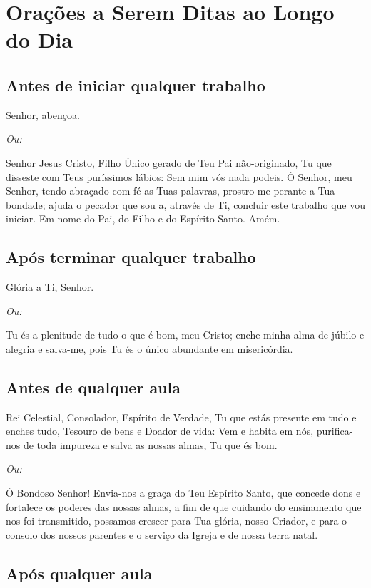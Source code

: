 \documentclass{subfiles}
\begin{document}
\chapter{Orações a Serem Ditas ao Longo do Dia}

\section*{Antes de iniciar qualquer trabalho}

Senhor, abençoa.

\textit{Ou:}

Senhor Jesus Cristo, Filho Único gerado de Teu Pai não-originado, Tu que 
disseste com Teus puríssimos lábios: Sem mim vós nada podeis. Ó Senhor, meu 
Senhor, tendo abraçado com fé as Tuas palavras, prostro-me perante a Tua 
bondade; ajuda o pecador que sou a, através de Ti, concluir este trabalho que 
vou iniciar. Em nome do Pai, do Filho e do Espírito Santo. Amém.

\section*{Após terminar qualquer trabalho}

Glória a Ti, Senhor.

\textit{Ou:}

Tu és a plenitude de tudo o que é bom, meu Cristo; enche minha alma de júbilo 
e alegria e salva-me, pois Tu és o único abundante em misericórdia. 

 
\section*{Antes de qualquer aula} 

Rei Celestial, Consolador, Espírito de Verdade, Tu que estás presente em tudo 
e enches tudo, Tesouro de bens e Doador de vida: Vem e habita em nós,
purifica-nos de toda impureza e salva as nossas almas, Tu que és bom. 

\textit{Ou:}

Ó Bondoso Senhor! Envia-nos a graça do Teu Espírito Santo, que concede dons e
fortalece os poderes das nossas almas, a fim de que cuidando do ensinamento que
nos foi transmitido, possamos crescer para Tua glória, nosso Criador, e para o
consolo dos nossos parentes e o serviço da Igreja e de nossa terra natal.

\section*{Após qualquer aula}
\end{document}
